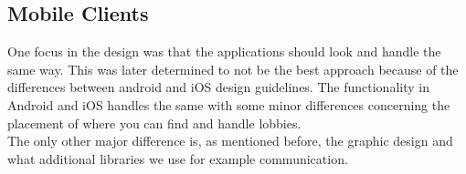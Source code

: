 \subsection{Mobile Clients}
One focus in the design was that the applications should look and handle the same way. This was later determined to not be the best approach because of the differences between android and iOS design guidelines. The functionality in Android and iOS handles the same with some minor differences concerning the placement of where you can find and handle lobbies.\\
The only other major difference is, as mentioned before, the graphic design and what additional libraries we use for example communication. 

